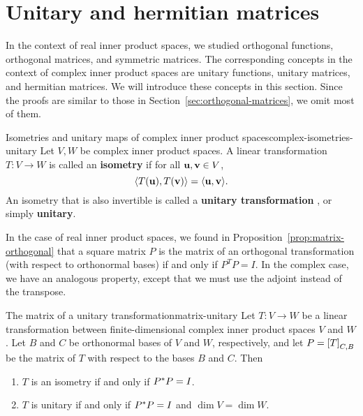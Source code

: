 \section{Unitary and hermitian matrices}

In the context of real inner product spaces, we studied orthogonal
functions, orthogonal matrices, and symmetric matrices. The
corresponding concepts in the context of complex inner product spaces
are unitary functions, unitary matrices, and hermitian matrices. We
will introduce these concepts in this section. Since the proofs are
similar to those in Section~\ref{sec:orthogonal-matrices}, we omit
most of them.

\begin{definition}{Isometries and unitary maps of complex inner product spaces}{complex-isometries-unitary}
  Let $V,W$ be complex inner product spaces. A linear transformation
  $T:V\to W$ is called an \textbf{isometry}%
   if for all
  $\vect{u},\vect{v}\in V$,
  \begin{equation*}
    \iprod{T(\vect{u}),T(\vect{v})} = \iprod{\vect{u},\vect{v}}.
  \end{equation*}
  An isometry that is also invertible is called a \textbf{unitary
    transformation}%
  , or simply \textbf{unitary}.
\end{definition}

In the case of real inner product spaces, we found in
Proposition~\ref{prop:matrix-orthogonal} that a square matrix $P$ is
the matrix of an orthogonal transformation (with respect to
orthonormal bases) if and only if $P^TP=I$. In the complex case, we
have an analogous property, except that we must use the adjoint
instead of the transpose.

\begin{proposition}{The matrix of a unitary transformation}{matrix-unitary}
  Let $T:V\to W$ be a linear transformation between finite-dimensional
  complex inner product spaces $V$ and $W$. Let $B$ and $C$ be
  orthonormal bases of $V$ and $W$, respectively, and let
  $P=\left[T\right]_{C,B}$ be the matrix of $T$ with respect to the bases
  $B$ and $C$. Then
  \begin{enumialphparenastyle}
    \begin{enumerate}
    \item $T$ is an isometry if and only if $P^{*}P = I$.
    \item $T$ is unitary if and only if $P^{*}P = I$ and
      $\dim V=\dim W$.
    \end{enumerate}
  \end{enumialphparenastyle}
\end{proposition}

